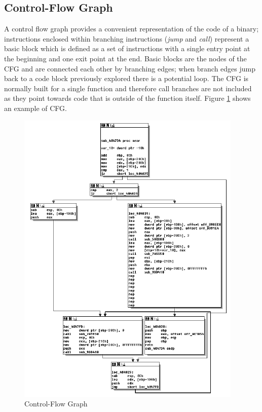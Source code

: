 \subsection{Control-Flow Graph}
A control flow graph provides a convenient representation of the code of a binary; instructions enclosed within
branching instructions (\textit{jump} and \textit{call}) represent a basic block which is defined as a set of
instructions with a single entry point at the beginning and one exit point at the end. Basic blocks are the nodes of the
CFG and are connected each other by branching edges; when branch edges jump back to a code block previously explored
there is a potential loop. The CFG is normally built for a single function and therefore call branches are not included
as they point towards code that is outside of the function itself. Figure \ref{CFG} shows an example of CFG.

\begin{figure}[!htbp]
    \begin{center}
        \includegraphics{./pics/CFG.png}
        \caption{Control-Flow Graph}
        \label{CFG}
    \end{center}
\end{figure}


